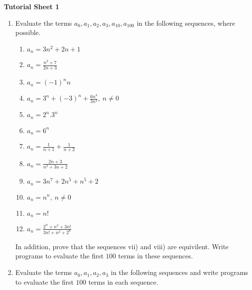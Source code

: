 \documentclass[11pt,a4paper,titlepage,oneside,openany]{article}
\numberwithin{equation}{section}
\numberwithin{algorithm}{section}
\numberwithin{figure}{section}
\numberwithin{table}{section}
\begin{document}
\begin{center}
  \textbf{Tutorial Sheet 1}
\end{center}

\begin{enumerate}
\item Evaluate the terms $a_0,a_1,a_2,a_3,a_{10},a_{100}$ in the following sequences, where possible.
  \begin{multicols}{2}
    \begin{enumerate}
    \item $a_n=3 n^2+2n +1$
    \item $a_n=\frac{n^2+7}{2n+3}$
    \item $a_n=(-1)^n n$
    \item $a_n=3^n + (-3)^n + \frac{6n^4}{3n^4},\  n\ne 0$
    \item $a_n=2^n .3^n$
    \item $a_n=6^n$
    \item $a_n=\frac{1}{n+1} + \frac{1}{n+2}$
    \item $a_n=\frac{2n+3}{n^2+3n+2}$
    \item $a_n=3n^7 + 2n^5 + n^5 +2$
    \item $a_n=n^n,\ n\ne0$
    \item $a_n=n!$
    \item $a_n=\frac{2^n+n^2+3n!}{3n!+n^2+2^n}$
    \end{enumerate}        
  \end{multicols}
  In addition, prove that the sequences vii) and viii) are equivilent. Write programs to evaluate the first $100$ terms in these sequences.
\item Evaluate the terms $a_0,a_1,a_2,a_3$ in the following sequences and write programs to evaluate the first $100$ terms in each sequence.


\end{enumerate}
\end{document}
